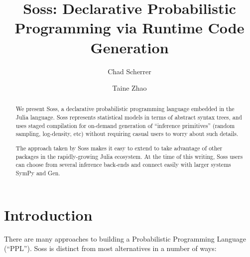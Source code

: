 \documentclass[anonymous=false, %
               format=acmsmall, %
               review=false, %
               screen=true, %
               nonacm=true]{acmart}
\begin{document}
\title{Soss: Declarative Probabilistic Programming via Runtime Code Generation}

\author{Chad Scherrer}

\author{Taine Zhao}

\begin{abstract}
We present Soss, a declarative probabilistic programming language embedded in the Julia language. Soss represents statistical models in terms of abstract syntax trees, and uses staged compilation for on-demand generation of ``inference primitives'' (random sampling, log-density, etc) without requiring casual users to worry about such details.

The approach taken by Soss makes it easy to extend to take advantage of other packages in the rapidly-growing Julia ecosystem. At the time of this writing, Soss users can choose from several inference back-ends and connect easily with larger systems SymPy and Gen.
\end{abstract}

\maketitle

\section{Introduction}

There are many approaches to building a Probabilistic Programming Language (``PPL''). Soss is distinct from most alternatives in a number of ways:
\end{document}
